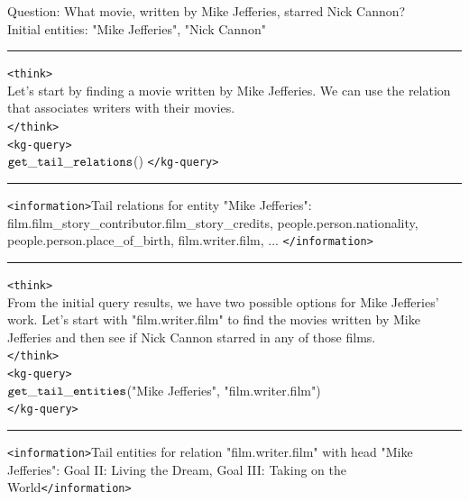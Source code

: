 \begin{table}[H]
\centering
\caption{Example \framework{} response in . \textcolor{blue}{Blue} denotes responses generated by the \framework{} agent.}
\begin{reasonbox}[title=\framework{} Response Example - \dataset{CWQ}]
Question: What movie, written by Mike Jefferies, starred Nick Cannon? \\
Initial entities: "Mike Jefferies", "Nick Cannon"
\vspace{0.5em}\hrule\vspace{0.5em}
\begin{blueblock}
\texttt{<think>} \\
Let's start by finding a movie written by Mike Jefferies. We can use the relation that associates writers with their movies. \\
\texttt{</think>} \\
\texttt{<kg-query>} \\
$\mathtt{get\_tail\_relations}$()
\texttt{</kg-query>} 
\end{blueblock}
\vspace{0.5em}\hrule\vspace{0.5em}
\texttt{<information>}Tail relations for entity "Mike Jefferies": \\
film.film\_story\_contributor.film\_story\_credits, people.person.nationality, people.person.place\_of\_birth, film.writer.film,  ... \texttt{</information>}
\vspace{0.5em}\hrule\vspace{0.5em}
\begin{blueblock}
\texttt{<think>} \\
From the initial query results, we have two possible options for Mike Jefferies' work. Let's start with "film.writer.film" to find the movies written by Mike Jefferies and then see if Nick Cannon starred in any of those films. \\
\texttt{</think>} \\
\texttt{<kg-query>} \\
$\mathtt{get\_tail\_entities}$("Mike Jefferies", "film.writer.film") \\
\texttt{</kg-query>}
\end{blueblock}
\vspace{0.5em}\hrule\vspace{0.5em}
\texttt{<information>}Tail entities for relation "film.writer.film" with head "Mike Jefferies": Goal II: Living the Dream, Goal III: Taking on the World\texttt{</information>} 

\end{reasonbox}
\end{table}
